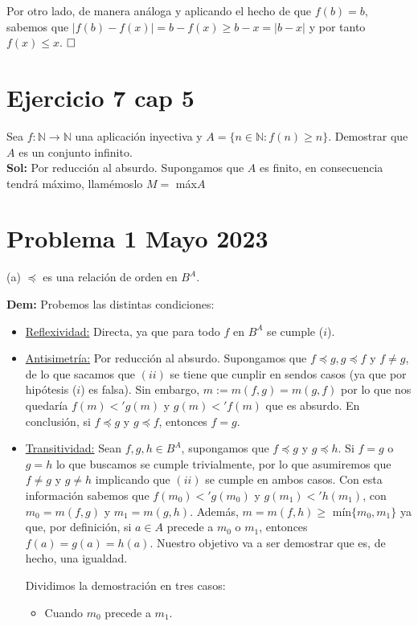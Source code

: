 \documentclass{article}
\begin{document}
Por otro lado, de manera análoga y aplicando el hecho de que $f(b) = b$, sabemos que $|f(b) - f(x)| = b - f(x) \geq b - x = |b - x|$ y por tanto $f(x) \leq x$. $\hfill\square$

\newpage

\section{Ejercicio 7 cap 5}

Sea $f : \mathbb{N} \longrightarrow \mathbb{N}$ una aplicación inyectiva y $A = \{n \in \mathbb{N} : f(n) \geq n\}$. Demostrar que $A$ es un conjunto infinito. \\

\noindent \textbf{Sol:} Por reducción al absurdo. Supongamos que $A$ es finito, en consecuencia tendrá máximo, llamémoslo $M =$ máx$A$

\newpage

\section{Problema 1 Mayo 2023}

(a) $\preceq$ es una relación de orden en $B^{A}.$

\noindent \textbf{Dem:} Probemos las distintas condiciones:

\begin{itemize}
    \item \underline{Reflexividad:} Directa, ya que para todo $f$ en $B^{A}$ se cumple ($i$).

    \item \underline{Antisimetría:} Por reducción al absurdo. Supongamos que $f \preceq g, g \preceq f$ y $f \neq g$, de lo que sacamos que $(ii)$ se tiene que cunplir en sendos casos (ya que por hipótesis ($i$) es falsa). Sin embargo, $m := m(f, g) = m(g, f)$ por lo que nos quedaría $f(m) <' g(m)$ y $g(m) <' f(m)$ que es absurdo. En conclusión, si $f \preceq g$ y $g \preceq f$, entonces $f = g$.

    \item \underline{Transitividad:} Sean $f, g, h \in B^{A}$, supongamos que $f \preceq g$ y $g \preceq h$. Si $f = g$ o $g = h$ lo que buscamos se cumple trivialmente, por lo que asumiremos que $f \neq g$ y $g \neq h$ implicando que $(ii)$ se cumple en ambos casos. Con esta información sabemos que $f(m_0) <' g(m_0)$ y $g(m_1) <' h(m_1)$, con $m_0 = m(f, g)$ y $m_1 = m(g, h)$. Además, $m = m(f, h) \geq$ mín$\{m_0, m_1\}$ ya que, por definición, si $a \in A$ precede a $m_0$ o $m_1$, entonces $f(a) = g(a) = h(a)$. Nuestro objetivo va a ser demostrar que es, de hecho, una igualdad.

    Dividimos la demostración en tres casos:

    \begin{itemize}
        \item Cuando $m_0$ precede a $m_1$.
    \end{itemize}
\end{itemize}
\end{document}

